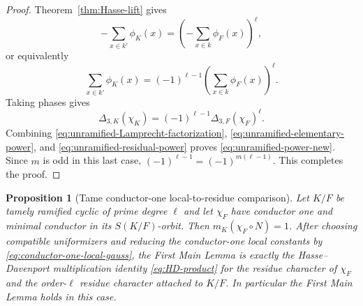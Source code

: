 \documentclass[11pt]{amsart}
\newtheorem{proposition}[theorem]{Proposition}
\theoremstyle{definition}
\theoremstyle{remark}
\begin{document}
\begin{proof}
Theorem~\ref{thm:Hasse-lift} gives
\[
 -\sum_{x\in k'}\phi_K(x)
 =\left(-\sum_{x\in k}\phi_F(x)\right)^\ell,
\]
or equivalently
\[
 \sum_{x\in k'}\phi_K(x)
 =(-1)^{\ell-1}\left(\sum_{x\in k}\phi_F(x)\right)^\ell.
\]
Taking phases gives
\begin{equation}\label{eq:unramified-residual-power}
 \Delta_{3,K}(\chi_K)
 =(-1)^{\ell-1}\Delta_{3,F}(\chi_F)^\ell.
\end{equation}
Combining \eqref{eq:unramified-Lamprecht-factorization},
\eqref{eq:unramified-elementary-power}, and
\eqref{eq:unramified-residual-power} proves
\eqref{eq:unramified-power-new}.  Since $m$ is odd in this last case,
$(-1)^{\ell-1}=(-1)^{m(\ell-1)}$.  This completes the proof.
\end{proof}

\begin{proposition}[Tame conductor-one local-to-residue comparison]
\label{prop:tame-conductor-one-comparison}
Let $K/F$ be tamely ramified cyclic of prime degree $\ell$ and let
$\chi_F$ have conductor one and minimal conductor in its
$S(K/F)$-orbit.  Then $m_K(\chi_F\circ N)=1$.  After choosing compatible
uniformizers and reducing the conductor-one local constants by
\eqref{eq:conductor-one-local-gauss}, the First Main Lemma is exactly
the Hasse--Davenport multiplication identity
\eqref{eq:HD-product} for the residue character of $\chi_F$ and the
order-$\ell$ residue character attached to $K/F$.  In particular the
First Main Lemma holds in this case.
\end{proposition}
\end{document}
